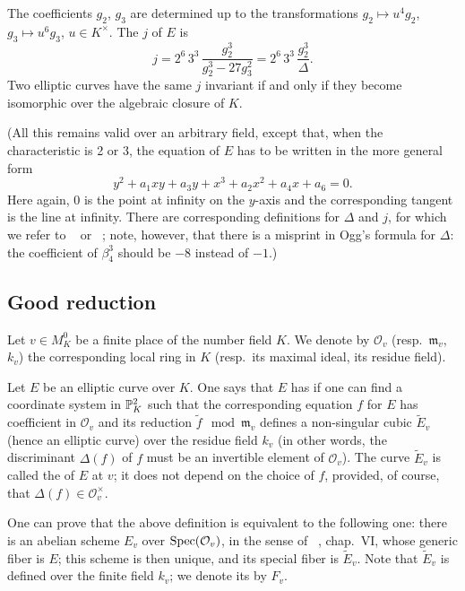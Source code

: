 The coefficients $g_2$, $g_3$ are determined up to the transformations $g_2
\mapsto u^4 g_2$, $g_3 \mapsto u^6 g_3$, $u \in K^\times$. The  $j$
of $E$ is
\[
	j = 2^6 \, 3^3 \, \frac{g_2^3}{g_2^3 - 27g_3^2}
	= 2^6 \, 3^3 \, \frac{g_2^3}{\Delta}.
\]
\dpage
Two elliptic curves have the same $j$ invariant if and only if they become
isomorphic over the algebraic closure of $K$.

(All this remains valid over an arbitrary field, except that, when the
characteristic is 2 or 3, the equation of $E$ has to be written in the more
general form
\[
	y^2 + a_1xy + a_3y + x^3 + a_2x^2 + a_4x + a_6 = 0.
\]
Here again, 0 is the point at infinity on the $y$-axis and the 
corresponding tangent is the line at infinity. There are corresponding
definitions for $\Delta$ and $j$, for which we refer to \citeauthor{9}~\cite{9}
or \citeauthor{20}~\cite{20}; note, however, that there is a misprint in Ogg's
formula for $\Delta$: the coefficient of $\beta_4^3$ should be $-8$ instead of
$-1$.)

\subsection{Good reduction}
\label{sec:IV_12}
Let $v \in M_K^0$ be a finite place of the number field $K$. We denote by
$\mathcal{O}_v$ (resp.\ $\mathfrak{m}_v$, $k_v$) the corresponding local ring
in $K$ (resp.\ its maximal ideal, its residue field).

Let $E$ be an elliptic curve over $K$. One says that $E$ has 
if one can find a coordinate system in $\mathbb{P}^2_K$ such that the corresponding
equation $f$ for $E$ has coefficient in $\mathcal{O}_v$ and its reduction
$\tilde f \mod{\mathfrak{m}_v}$ defines a non-singular cubic $\widetilde{E}_v$
(hence an elliptic curve) over the residue field $k_v$ (in other words, the
discriminant $\Delta(f)$ of $f$ must be an invertible element of
$\mathcal{O}_v$).
The curve $\widetilde{E}_v$ is called the  of $E$ at $v$;
\dpage
it does not depend on the choice of $f$, provided, of course, that $\Delta(f) \in
\mathcal{O}_v^\times$.

One can prove that the above definition is equivalent to the following one:
there is an abelian scheme $E_v$ over $\operatorname{Spec}(\mathcal{O}_v)$, in the sense of
\citeauthor{19}~\cite{19}, chap.\ VI, whose generic fiber is $E$; this scheme
is then unique, and its special fiber is $\widetilde{E}_v$. Note that
$\widetilde{E}_v$ is defined over the finite field $k_v$; we denote its
 by $F_v$.


